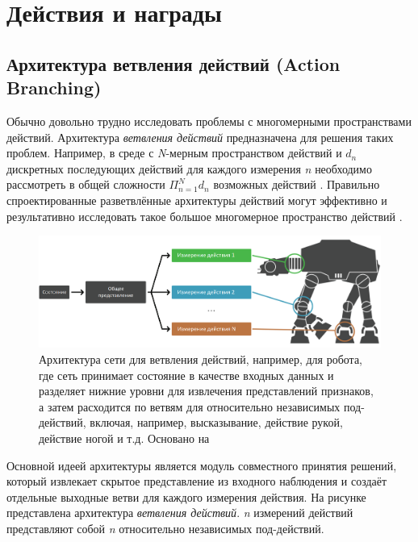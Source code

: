 \section{Действия и награды} \label{ch2:act-rew} %

\subsection{Архитектура ветвления действий (Action Branching)}

Обычно довольно трудно исследовать проблемы с многомерными пространствами действий. Архитектура \textit{ветвления действий} предназначена для решения таких проблем. Например, в среде с \textit{N}-мерным пространством действий и $d_n$ дискретных последующих действий для каждого измерения \textit{n} необходимо рассмотреть в общей сложности $\Pi^N_{n=1} d_n$ возможных действий \cite{tavakoli2017action}. Правильно спроектированные разветвлённые архитектуры действий могут эффективно и результативно исследовать такое большое многомерное пространство действий \cite{tavakoli2017action}.

\begin{figure}[ht!]
    \center
    \includegraphics [scale=0.4] {my_folder/images/ch2/action-branching.png}
    \caption{Архитектура сети для ветвления действий, например, для робота, где сеть принимает состояние в качестве входных данных и разделяет нижние уровни для извлечения представлений признаков, а затем расходится по ветвям для относительно независимых под-действий, включая, например, высказывание, действие рукой, действие ногой и т.д. Основано на \cite{tavakoli2017action}}
    \label{fig:ch2-action-branching}
\end{figure}

Основной идеей архитектуры является модуль совместного принятия решений, который извлекает скрытое представление из входного наблюдения и создаёт отдельные выходные ветви для каждого измерения действия. На рисунке  представлена архитектура \textit{ветвления действий}. \textit{n} измерений действий представляют собой \textit{n} относительно независимых под-действий.

